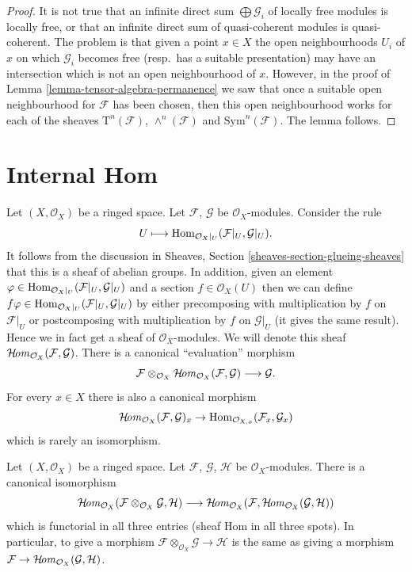 \begin{proof}
It is not true that an infinite direct sum $\bigoplus \mathcal{G}_i$ of
locally free modules is locally free, or that an
infinite direct sum of quasi-coherent modules
is quasi-coherent. The problem is that given a
point $x \in X$ the open neighbourhoods $U_i$ of $x$ on which $\mathcal{G}_i$
becomes free (resp.\ has a suitable presentation) may have an intersection
which is not an open neighbourhood of $x$. However, in the
proof of Lemma \ref{lemma-tensor-algebra-permanence} we saw that
once a suitable open neighbourhood for $\mathcal{F}$ has been chosen,
then this open neighbourhood works for each of the sheaves
$\text{T}^n(\mathcal{F})$, $\wedge^n(\mathcal{F})$ and
$\text{Sym}^n(\mathcal{F})$.
The lemma follows.
\end{proof}







\section{Internal Hom}
\label{section-internal-hom}

\noindent
Let $(X, \mathcal{O}_X)$ be a ringed space.
Let $\mathcal{F}$, $\mathcal{G}$ be $\mathcal{O}_X$-modules.
Consider the rule
$$
U \longmapsto \mathop{\mathrm{Hom}}\nolimits_{\mathcal{O}_X|_U}(\mathcal{F}|_U, \mathcal{G}|_U).
$$
It follows from the discussion in Sheaves, Section
\ref{sheaves-section-glueing-sheaves} that this is a sheaf of
abelian groups. In addition, given an element
$\varphi \in \mathop{\mathrm{Hom}}\nolimits_{\mathcal{O}_X|_U}(\mathcal{F}|_U, \mathcal{G}|_U)$
and a section $f \in \mathcal{O}_X(U)$ then we can define
$f\varphi \in \mathop{\mathrm{Hom}}\nolimits_{\mathcal{O}_X|_U}(\mathcal{F}|_U, \mathcal{G}|_U)$
by either precomposing with multiplication by $f$ on $\mathcal{F}|_U$
or postcomposing with multiplication by $f$ on $\mathcal{G}|_U$ (it gives
the same result). Hence we in fact get a sheaf of $\mathcal{O}_X$-modules.
We will denote this sheaf
$\mathop{\mathcal{H}\!\mathit{om}}\nolimits_{\mathcal{O}_X}(\mathcal{F}, \mathcal{G})$.
There is a canonical ``evaluation'' morphism
$$
\mathcal{F}
\otimes_{\mathcal{O}_X}
\mathop{\mathcal{H}\!\mathit{om}}\nolimits_{\mathcal{O}_X}(\mathcal{F}, \mathcal{G})
\longrightarrow
\mathcal{G}.
$$
For every $x \in X$ there is also a canonical morphism
$$
\mathop{\mathcal{H}\!\mathit{om}}\nolimits_{\mathcal{O}_X}(\mathcal{F}, \mathcal{G})_x
\to
\mathop{\mathrm{Hom}}\nolimits_{\mathcal{O}_{X, x}}(\mathcal{F}_x, \mathcal{G}_x)
$$
which is rarely an isomorphism.

\begin{lemma}
\label{lemma-internal-hom}
Let $(X, \mathcal{O}_X)$ be a ringed space.
Let $\mathcal{F}$, $\mathcal{G}$, $\mathcal{H}$ be $\mathcal{O}_X$-modules.
There is a canonical isomorphism
$$
\mathop{\mathcal{H}\!\mathit{om}}\nolimits_{\mathcal{O}_X}
(\mathcal{F} \otimes_{\mathcal{O}_X} \mathcal{G}, \mathcal{H})
\longrightarrow
\mathop{\mathcal{H}\!\mathit{om}}\nolimits_{\mathcal{O}_X}
(\mathcal{F}, \mathop{\mathcal{H}\!\mathit{om}}\nolimits_{\mathcal{O}_X}(\mathcal{G}, \mathcal{H}))
$$
which is functorial in all three entries (sheaf Hom in
all three spots). In particular, to give a
morphism $\mathcal{F} \otimes_{\mathcal{O}_X} \mathcal{G} \to \mathcal{H}$
is the same as giving a morphism
$\mathcal{F} \to \mathop{\mathcal{H}\!\mathit{om}}\nolimits_{\mathcal{O}_X}(\mathcal{G}, \mathcal{H})$.
\end{lemma}

